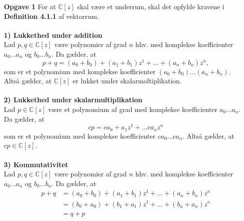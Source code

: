 \documentclass[12pt,a4paper]{report}
\author{Gruppe 7}
\begin{document}
\noindent \textbf{Opgave 1}
For at $\mathbb{C}[z]$ skal være et underrum, skal det opfylde kravene i \textbf{Definition 4.1.1} af vektorrum.\\\\
\textbf{1) Lukkethed under addition}\\
Lad $p,q \in \mathbb{C}[z]$ være polynomier af grad $n$ hhv. med komplekse koefficienter $a_0...a_n$ og $b_0...b_n$. Da gælder, at
\begin{equation}
p+q=(a_0+b_0)+(a_1+b_1)z^1+...+(a_n+b_n)z^n,
\end{equation}
som er et polynomium med komplekse koefficienter $(a_0+b_0)...(a_n+b_n)$. Altså gælder, at $\mathbb{C}[z]$ er lukket under skalarmoltiplikation.\\\\
\textbf{2) Lukkethed under skalarmultiplikation}\\
Lad $p \in \mathbb{C}[z]$ være et polynomium af grad med komplekse koefficienter $a_0...a_n$. Da gælder, at
\begin{equation}
cp=ca_0+a_1z^1+...ca_nz^n
\end{equation}
som er et polynomium med komplekse koefficienter $ca_0...ca_n$. Altså gælder, at $cp \in \mathbb{C}[z]$.\\\\
\textbf{3) Kommutativitet}\\
Lad $p,q \in \mathbb{C}[z]$ være polynomier af grad $n$ hhv. med komplekse koefficienter $a_0...a_n$ og $b_0...b_n$. Da gælder, at
\begin{align}
p+q & =(a_0+b_0)+(a_1+b_1)z^1+...+(a_n+b_n)z^n \\
& = (b_0+a_0)+(b_1+a_1)z^1+...+(b_n+a_n)z^n \\
& = q+p
\end{align}
\end{document}
